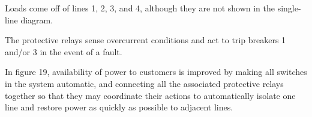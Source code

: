 \vskip 10pt

Loads come off of lines 1, 2, 3, and 4, although they are not shown in the single-line diagram.

\vskip 10pt

The protective relays sense overcurrent conditions and act to trip breakers 1 and/or 3 in the event of a fault.

\vskip 10pt

In figure 19, availability of power to customers is improved by making all switches in the system automatic, and connecting all the associated protective relays together so that they may coordinate their actions to automatically isolate one line and restore power as quickly as possible to adjacent lines.




